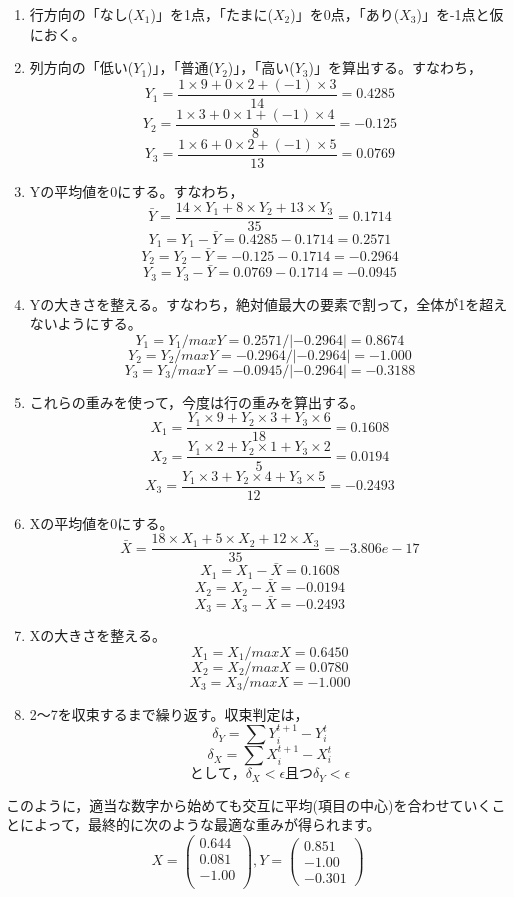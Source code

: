 \documentclass{ltjsbook}
\begin{document}
\begin{enumerate}
    \item 行方向の「なし($X_{1}$)」を1点，「たまに($X_{2}$)」を0点，「あり($X_{3}$)」を-1点と仮におく。
    \item 列方向の「低い($Y_{1}$)」，「普通($Y_{2}$)」，「高い($Y_{3}$)」を算出する。すなわち，
          $$Y_{1}=\frac{1 \times 9 + 0 \times 2 + (-1) \times 3 }{14} = 0.4285$$
          $$Y_{2}=\frac{1 \times 3 + 0 \times 1 + (-1) \times 4 }{8} = -0.125$$
          $$Y_{3}=\frac{1 \times 6 + 0 \times 2 + (-1) \times 5 }{13} = 0.0769$$
    \item Yの平均値を0にする。すなわち，
          $$ \bar{Y} = \frac{14 \times Y_{1} + 8 \times Y_{2} + 13 \times Y_{3}}{35}=0.1714$$
          $$Y_{1} = Y_{1} - \bar{Y} = 0.4285 - 0.1714 = 0.2571$$
          $$Y_{2} = Y_{2} - \bar{Y} = -0.125 - 0.1714 = -0.2964$$
          $$Y_{3} = Y_{3} - \bar{Y} = 0.0769 - 0.1714 = -0.0945$$
    \item Yの大きさを整える。すなわち，絶対値最大の要素で割って，全体が1を超えないようにする。
          $$Y_{1} = Y_{1} / maxY = 0.2571 / |-0.2964| = 0.8674 $$
          $$Y_{2} = Y_{2} / maxY = -0.2964 / |-0.2964| = -1.000 $$
          $$Y_{3} = Y_{3} / maxY = -0.0945 / |-0.2964| = -0.3188 $$
    \item これらの重みを使って，今度は行の重みを算出する。
          $$X_{1}=\frac{Y_{1} \times 9 + Y_{2} \times 3 + Y_{3} \times 6 }{18} = 0.1608$$
          $$X_{2}=\frac{Y_{1} \times 2 + Y_{2} \times 1 + Y_{3} \times 2 }{5} = 0.0194$$
          $$X_{3}=\frac{Y_{1} \times 3 + Y_{2} \times 4 + Y_{3} \times 5 }{12} = -0.2493$$
    \item Xの平均値を0にする。
          $$ \bar{X} = \frac{18 \times X_{1} + 5 \times X_{2} + 12 \times X_{3}}{35}=-3.806e-17$$
          $$X_{1} = X_{1} - \bar{X} = 0.1608$$
          $$X_{2} = X_{2} - \bar{X} = -0.0194$$
          $$X_{3} = X_{3} - \bar{X} = -0.2493$$
    \item Xの大きさを整える。
          $$X_{1} = X_{1} / maxX = 0.6450 $$
          $$X_{2} = X_{2} / maxX = 0.0780 $$
          $$X_{3} = X_{3} / maxX = -1.000 $$
    \item 2〜7を収束するまで繰り返す。収束判定は，
          $$ \delta_{Y} = \sum Y_{i}^{t+1} - Y_{i}^{t} $$
          $$ \delta_{X} = \sum X_{i}^{t+1} - X_{i}^{t} $$
          $$ として，\delta_{X} < \epsilon　且つ　\delta_{Y} < \epsilon $$
\end{enumerate}

このように，適当な数字から始めても交互に平均(項目の中心)を合わせていくことによって，最終的に次のような最適な重みが得られます。
\[
    X=
    \left(
    \begin{array}{c}
            0.644 \\
            0.081 \\
            -1.00 \\
        \end{array}
    \right)
    ,Y=
    \left(
    \begin{array}{c}
            0.851 \\
            -1.00 \\
            -0.301
        \end{array}
    \right)
\]
\end{document}
